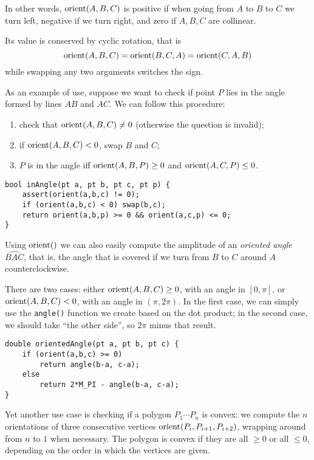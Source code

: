 In other words, $\operatorname{orient}(A,B,C)$ is positive if when going from $A$ to $B$ to $C$ we turn left, negative if we turn right, and zero if $A,B,C$ are collinear.


Its value is conserved by cyclic rotation, that is \[\operatorname{orient}(A,B,C) = \operatorname{orient}(B,C,A) = \operatorname{orient}(C,A,B)\] while swapping any two arguments switches the sign.

As an example of use, suppose we want to check if point $P$ lies in the angle formed by lines $AB$ and $AC$. We can follow this procedure:
\begin{enumerate}
\item check that $\operatorname{orient}(A,B,C) \neq 0$ (otherwise the question is invalid);
\item if $\operatorname{orient}(A,B,C) < 0$, swap $B$ and $C$;
\item $P$ is in the angle iff $\operatorname{orient}(A,B,P) \geq 0$ and $\operatorname{orient}(A,C,P) \leq 0$.
\end{enumerate}
\begin{lstlisting}
bool inAngle(pt a, pt b, pt c, pt p) {
    assert(orient(a,b,c) != 0);
    if (orient(a,b,c) < 0) swap(b,c);
    return orient(a,b,p) >= 0 && orient(a,c,p) <= 0;
}
\end{lstlisting}

Using $\operatorname{orient}()$ we can also easily compute the amplitude of an \emph{oriented angle} $\widehat{BAC}$, that is, the angle that is covered if we turn from $B$ to $C$ around $A$ counterclockwise.

There are two cases: either $\operatorname{orient}(A,B,C) \geq 0$, with an angle in $[0,\pi]$, or $\operatorname{orient}(A,B,C) < 0$, with an angle in $(\pi,2\pi)$. In the first case, we can simply use the \lstinline|angle()| function we create based on the dot product; in the second case, we should take ``the other side'', so $2\pi$ minus that result.


\begin{lstlisting}
double orientedAngle(pt a, pt b, pt c) {
    if (orient(a,b,c) >= 0)
        return angle(b-a, c-a);
    else
        return 2*M_PI - angle(b-a, c-a);
}
\end{lstlisting}

Yet another use case is checking if a polygon $P_1\cdots P_n$ is convex: we compute the $n$ orientations of three consecutive vertices $\operatorname{orient}(P_i,P_{i+1},P_{i+2})$, wrapping around from $n$ to $1$ when necessary. The polygon is convex if they are all $\geq 0$ or all $\leq 0$, depending on the order in which the vertices are given.

